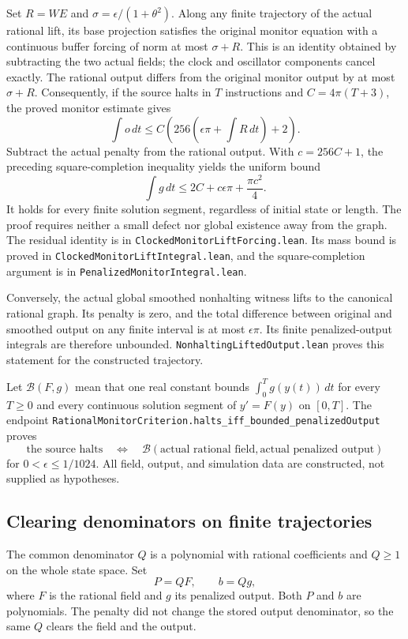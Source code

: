 \documentclass[11pt]{article}
\newcommand{\code}[1]{{\small\nolinkurl{#1}}}
\begin{document}
Set $R=WE$ and $\sigma=\epsilon/(1+\theta^2)$. Along any finite trajectory
of the actual rational lift, its base projection satisfies the original
monitor equation with a continuous buffer forcing of norm at most
$\sigma+R$. This is an identity obtained by subtracting the two actual
fields; the clock and oscillator components cancel exactly. The rational
output differs from the original monitor output by at most $\sigma+R$.
Consequently, if the source halts in $T$ instructions and
$C=4\pi(T+3)$, the proved monitor estimate gives
\[
 \int o\,dt\le C\left(256\left(\epsilon\pi+\int R\,dt\right)+2\right).
\]
Subtract the actual penalty from the rational output. With $c=256C+1$,
the preceding square-completion inequality yields the uniform bound
\[
 \int g\,dt\le 2C+c\epsilon\pi+\frac{\pi c^2}{4}.
\]
It holds for every finite solution segment, regardless of initial state
or length. The proof requires neither a small defect nor global
existence away from the graph. The residual identity is in
\code{ClockedMonitorLiftForcing.lean}. Its mass bound is proved in
\code{ClockedMonitorLiftIntegral.lean}, and the square-completion argument
is in \code{PenalizedMonitorIntegral.lean}.

Conversely, the actual global smoothed nonhalting witness lifts to the
canonical rational graph. Its penalty is zero, and the total difference
between original and smoothed output on any finite interval is at most
$\epsilon\pi$. Its finite penalized-output integrals are therefore
unbounded. \code{NonhaltingLiftedOutput.lean} proves this statement for
the constructed trajectory.

Let $\mathcal B(F,g)$ mean that one real constant bounds
$\int_0^T g(y(t))\,dt$ for every $T\ge0$ and every continuous solution
segment of $y'=F(y)$ on $[0,T]$. The endpoint
\code{RationalMonitorCriterion.halts_iff_bounded_penalizedOutput} proves
\[
 \text{the source halts}\quad\Longleftrightarrow\quad
 \mathcal B(\text{actual rational field},\text{actual penalized output})
\]
for $0<\epsilon\le1/1024$. All field, output, and simulation data are
constructed, not supplied as hypotheses.

\subsection{Clearing denominators on finite trajectories}

The common denominator $Q$ is a polynomial with rational coefficients
and $Q\ge1$ on the whole state space. Set
\[
 P=QF,\qquad b=Qg,
\]
where $F$ is the rational field and $g$ its penalized output. Both $P$
and $b$ are polynomials. The penalty did not change the stored output
denominator, so the same $Q$ clears the field and the output.
\end{document}
